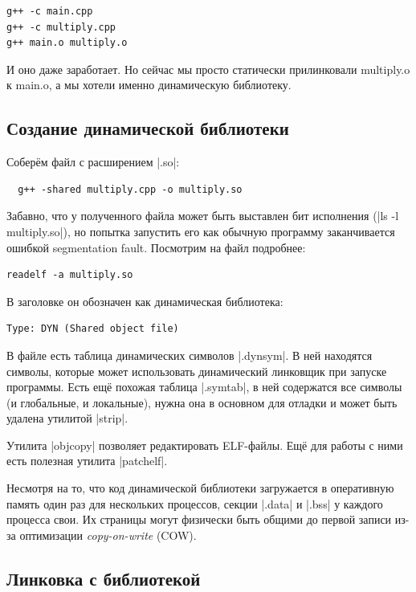 \documentclass[11pt]{article}
\begin{document}
\begin{lstlisting}
g++ -c main.cpp
g++ -c multiply.cpp
g++ main.o multiply.o
\end{lstlisting}

И оно даже заработает. Но сейчас мы просто статически прилинковали multiply.o к main.o, а мы хотели именно динамическую библиотеку.

\subsection{Создание динамической библиотеки}

Соберём файл с расширением \nolint|.so|:

\begin{lstlisting}
  g++ -shared multiply.cpp -o multiply.so
\end{lstlisting}

Забавно, что у полученного файла может быть выставлен бит исполнения (\nolint|ls -l multiply.so|),
но попытка запустить его как обычную программу заканчивается ошибкой segmentation fault.
Посмотрим на файл подробнее:
\begin{lstlisting}
readelf -a multiply.so
\end{lstlisting}
В заголовке он обозначен как динамическая библиотека:
\begin{lstlisting}
Type: DYN (Shared object file)
\end{lstlisting}

В файле есть таблица динамических символов \nolint|.dynsym|. В ней находятся символы, которые может использовать динамический линковщик при запуске программы. Есть ещё похожая таблица \nolint|.symtab|, в ней содержатся все символы (и глобальные, и локальные), нужна она в основном для отладки и может быть удалена утилитой \nolint|strip|.

Утилита \nolint|objcopy| позволяет редактировать ELF-файлы. Ещё для работы с ними есть
полезная утилита \nolint|patchelf|.

Несмотря на то, что код динамической библиотеки загружается в оперативную память один раз для
нескольких процессов, секции \nolint|.data| и \nolint|.bss| у каждого процесса свои. Их страницы могут
физически быть общими до первой записи из-за оптимизации \textit{copy-on-write} (COW).

\subsection{Линковка с библиотекой}
\end{document}

